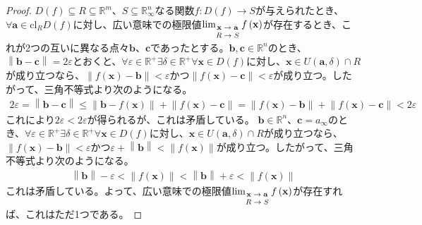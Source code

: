 \documentclass[dvipdfmx]{jsarticle}
\begin{document}
\begin{proof}
$D(f) \subseteq R \subseteq \mathbb{R}^{m}$、$S \subseteq \mathbb{R}_{\infty}^{n}$なる関数$f:D(f) \rightarrow S$が与えられたとき、$\forall\mathbf{a} \in \mathrm{cl}_{R}{D(f)}$に対し、広い意味での極限値$\lim_{\scriptsize \begin{matrix} \mathbf{x} \rightarrow \mathbf{a} \\ R \rightarrow S \\\end{matrix}}{f\left( \mathbf{x} \right)}$が存在するとき、これが2つの互いに異なる点々$\mathbf{b}$、$\mathbf{c}$であったとする。$\mathbf{b},\mathbf{c} \in \mathbb{R}^{n}$のとき、$\left\| \mathbf{b} - \mathbf{c} \right\| = 2\varepsilon$とおくと、$\forall\varepsilon \in \mathbb{R}^{+}\exists\delta \in \mathbb{R}^{+}\forall\mathbf{x} \in D(f)$に対し、$\mathbf{x} \in U\left( \mathbf{a},\delta \right) \cap R$が成り立つなら、$\left\| f\left( \mathbf{x} \right) - \mathbf{b} \right\| < \varepsilon$かつ$\left\| f\left( \mathbf{x} \right) - \mathbf{c} \right\| < \varepsilon$が成り立つ。したがって、三角不等式より次のようになる。
\begin{align*}
2\varepsilon = \left\| \mathbf{b} - \mathbf{c} \right\| \leq \left\| \mathbf{b} - f\left( \mathbf{x} \right) \right\| + \left\| f\left( \mathbf{x} \right) - \mathbf{c} \right\| = \left\| f\left( \mathbf{x} \right) - \mathbf{b} \right\| + \left\| f\left( \mathbf{x} \right) - \mathbf{c} \right\| < 2\varepsilon
\end{align*}
これにより$2\varepsilon < 2\varepsilon$が得られるが、これは矛盾している。
$\mathbf{b} \in \mathbb{R}^{n}$、$\mathbf{c} = a_{\infty}$のとき、$\forall\varepsilon \in \mathbb{R}^{+}\exists\delta \in \mathbb{R}^{+}\forall\mathbf{x} \in D(f)$に対し、$\mathbf{x} \in U\left( \mathbf{a},\delta \right) \cap R$が成り立つなら、$\left\| f\left( \mathbf{x} \right) - \mathbf{b} \right\| < \varepsilon$かつ$\varepsilon + \left\| \mathbf{b} \right\| < \left\| f\left( \mathbf{x} \right) \right\|$が成り立つ。したがって、三角不等式より次のようになる。
\begin{align*}
\left\| \mathbf{b} \right\| - \varepsilon < \left\| f\left( \mathbf{x} \right) \right\| < \left\| \mathbf{b} \right\| + \varepsilon < \left\| f\left( \mathbf{x} \right) \right\|
\end{align*}
これは矛盾している。よって、広い意味での極限値$\lim_{\scriptsize \begin{matrix} \mathbf{x} \rightarrow \mathbf{a} \\ R \rightarrow S \\\end{matrix}}{f\left( \mathbf{x} \right)}$が存在すれば、これはただ1つである。
\end{proof}
\end{document}
